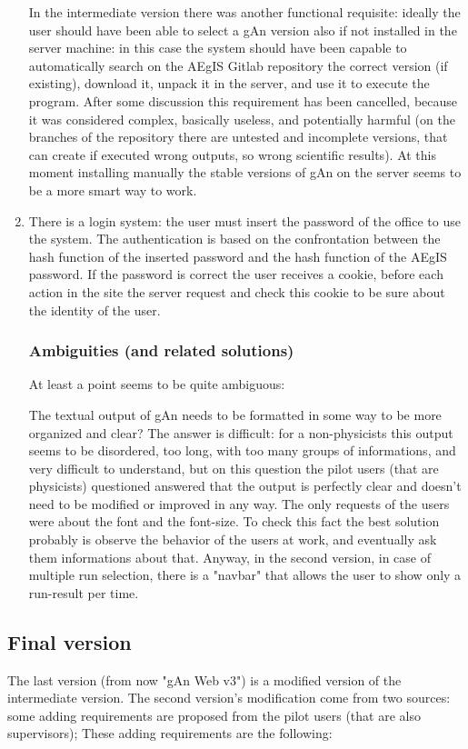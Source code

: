 \begin{enumerate}
In the intermediate version there was another functional requisite: ideally the user should have been able to select a gAn version also if not installed in the server machine: in this case the system should have been capable to automatically search on the AEgIS Gitlab repository the correct version (if existing), download it, unpack it in the server, and use it to execute the program. 
After some discussion this requirement has been cancelled, because it was considered complex, basically useless, and potentially harmful (on the branches of the repository there are untested and incomplete versions, that can create if executed wrong outputs, so wrong scientific results). At this moment installing manually the stable versions of gAn on the server seems to be a more smart way to work.

\item There is a login system: the user must insert the password of the office to use the system. The authentication is based on the confrontation between the hash function of the inserted password and the hash function of the AEgIS password. If the password is correct the user receives a cookie, before each action in the site the server request and check this cookie to be sure about the identity of the user.  


\subsubsection{Ambiguities (and related solutions)}

At least a point seems to be quite ambiguous: 

The textual output of gAn needs to be formatted in some way to be more organized and clear? 
The answer is difficult: for a non-physicists this output seems to be disordered, too long, with too many groups of informations, and very difficult to understand, but on this question the pilot users (that are physicists) questioned answered that the output is perfectly clear and doesn't need to be modified or improved in any way. The only requests of the users were about the font and the font-size. To check this fact the best solution probably is observe the behavior of the users at work, and eventually ask them informations about that.
Anyway, in the second version, in case of multiple run selection, there is a "navbar" that allows the user to show only a run-result per time.


\end{enumerate}

\subsection{Final version}
The last version (from now "gAn Web v3") is a modified version of the intermediate version. 
The second version's modification come from two sources: some adding requirements are proposed from the pilot users (that are also supervisors); These adding requirements are the following:

